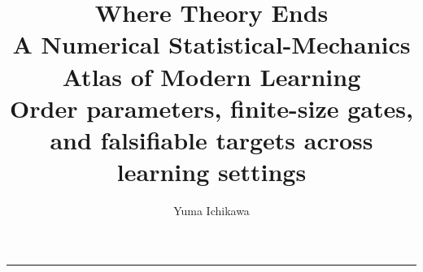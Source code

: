 \documentclass[10pt]{article}
\title{\textcolor{AtlasNavy}{\bfseries Where Theory Ends\\
A Numerical Statistical-Mechanics Atlas of Modern Learning}\\[0.45em]
\large\color{AtlasGray}Order parameters, finite-size gates, and falsifiable targets
across \AtlasTotalFamilies{} learning settings}
\author{Yuma Ichikawa}
\date{}
\begin{document}
\maketitle
\vspace{-1.5em}
\begin{center}
  \color{AtlasBlue}\rule{0.82\linewidth}{1.1pt}
\end{center}
\vspace{-0.7em}

















\FloatBarrier
\clearpage
\appendix


\FloatBarrier
\clearpage


\end{document}
